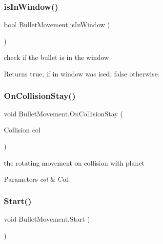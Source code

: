 \subsubsection{\texorpdfstring{is\+In\+Window()}{isInWindow()}}
{\footnotesize\ttfamily bool Bullet\+Movement.\+is\+In\+Window (\begin{DoxyParamCaption}{ }\end{DoxyParamCaption})\hspace{0.3cm}{\ttfamily [private]}}



check if the bullet is in the window 

\begin{DoxyReturn}{Returns}
{\ttfamily true}, if in window was ised, {\ttfamily false} otherwise.
\end{DoxyReturn}
\mbox{\label{class_bullet_movement_a331fc1849938f5faf8aec9999f288d4c}} 
\subsubsection{\texorpdfstring{On\+Collision\+Stay()}{OnCollisionStay()}}
{\footnotesize\ttfamily void Bullet\+Movement.\+On\+Collision\+Stay (\begin{DoxyParamCaption}\item[{Collision}]{col }\end{DoxyParamCaption})\hspace{0.3cm}{\ttfamily [private]}}



the rotating movement on collision with planet 


\begin{DoxyParams}{Parameters}
{\em col} & Col.\\
\hline
\end{DoxyParams}
\mbox{\label{class_bullet_movement_aedea440e001bde34585c344da0557b6e}} 
\subsubsection{\texorpdfstring{Start()}{Start()}}
{\footnotesize\ttfamily void Bullet\+Movement.\+Start (\begin{DoxyParamCaption}{ }\end{DoxyParamCaption})\hspace{0.3cm}{\ttfamily [private]}}



